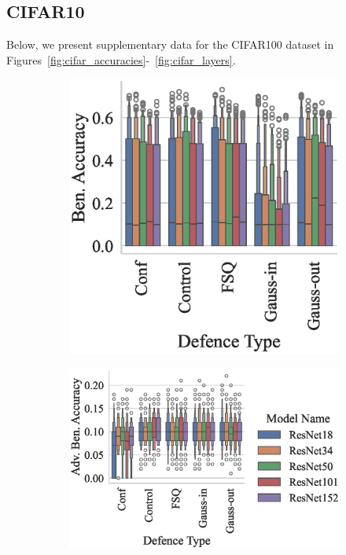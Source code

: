 \subsection{CIFAR10}
Below, we present supplementary data for the CIFAR100 dataset in Figures~\ref{fig:cifar_accuracies}-~\ref{fig:cifar_layers}.


\begin{figure}
\begin{subfigure}[]{0.27\textwidth}
    \centering
    \includegraphics[width=\textwidth]{cifar_ben_accuracy_vs_defence_type.eps}
\end{subfigure}
\begin{subfigure}[]{0.27\textwidth}
    \centering
    \includegraphics[width=\textwidth]{cifar_adv_accuracy_vs_defence_type.eps}

\end{subfigure}
\end{figure}

